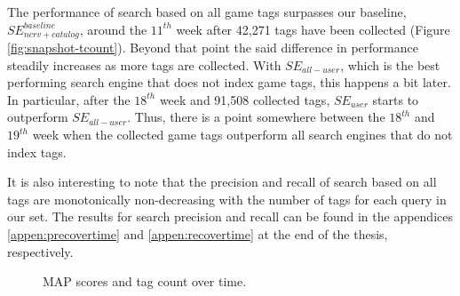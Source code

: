 The performance of search based on all game tags surpasses our baseline, $SE_{ncrv+catalog}^{baseline}$, around the $11^{th}$ week after 42,271 tags have been collected (Figure \ref{fig:snapshot-tcount}). Beyond that point the said difference in performance steadily increases as more tags are collected. With $SE_{all-user}$, which is the best performing search engine that does not index game tags, this happens a bit later. In particular, after the $18^{th}$ week and 91,508 collected tags, $SE_{user}$ starts to outperform $SE_{all-user}$. Thus, there is a point somewhere between the $18^{th}$ and $19^{th}$ week when the collected game tags outperform all search engines that do not index tags.

It is also interesting to note that the precision and recall of search based on all tags are monotonically non-decreasing with the number of tags for each query in our set. The results for search precision and recall can be found in the appendices \ref{appen:precovertime} and \ref{appen:recovertime} at the end of the thesis, respectively.

\begin{figure}
\caption{MAP scores and tag count over time.}
\end{figure}

